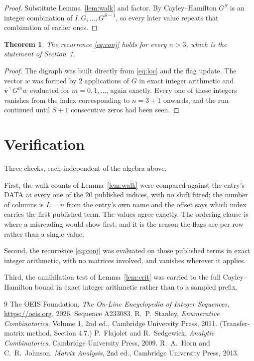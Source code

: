 \documentclass[11pt,a4paper]{article}
\theoremstyle{plain}
\newtheorem{theorem}{Theorem}
\theoremstyle{definition}
\begin{document}
\begin{proof}
Substitute Lemma~\ref{lem:walk} and factor. By Cayley--Hamilton $G^{S}$ is an integer
combination of $I,G,\dots,G^{S-1}$, so every later value repeats that combination of earlier
ones.
\end{proof}

\begin{theorem}
The recurrence \eqref{eq:conj} holds for every $n>3$, which is the statement of
Section~1.
\end{theorem}

\begin{proof}
The digraph was built directly from \eqref{eq:loc} and the flag update. The vector $w$ was
formed by $2$ applications of $G$ in exact integer arithmetic and
$\mathbf{v}^{\!\top}G^{m}w$ evaluated for $m=0,1,\dots$, again exactly. Every one of
those integers vanishes from the index corresponding to $n=3+1$ onwards, and the run
continued until $S+1$ consecutive zeros had been seen.
\end{proof}

\section{Verification}

Three checks, each independent of the algebra above.

First, the walk counts of Lemma~\ref{lem:walk} were compared against the entry's DATA at
every one of the $20$ published indices, with no shift fitted: the number of columns is
$L=n$ from the entry's own name and the offset says which index carries the first
published term. The values agree exactly. The ordering clause is where a misreading would
show first, and it is the reason the flags are per row rather than a single value.

Second, the recurrence \eqref{eq:conj} was evaluated on those published terms in exact
integer arithmetic, with no matrices involved, and vanishes wherever it applies.

Third, the annihilation test of Lemma~\ref{lem:crit} was carried to the full
Cayley--Hamilton bound in exact integer arithmetic rather than to a sampled prefix.

\begin{thebibliography}{9}
 The OEIS Foundation, \emph{The On-Line Encyclopedia of Integer
Sequences}, \url{https://oeis.org}, 2026. Sequence A233083.
 R.~P.~Stanley, \emph{Enumerative Combinatorics}, Volume 1, 2nd ed.,
Cambridge University Press, 2011. (Transfer-matrix method, Section 4.7.)
 P.~Flajolet and R.~Sedgewick, \emph{Analytic Combinatorics}, Cambridge
University Press, 2009.
 R.~A.~Horn and C.~R.~Johnson, \emph{Matrix Analysis}, 2nd ed., Cambridge
University Press, 2013.
\end{thebibliography}
\end{document}
